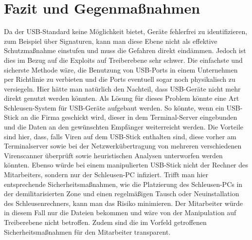 \chapter{Fazit und Gegenmaßnahmen}
Da der USB-Standard keine Möglichkeit bietet, Geräte fehlerfrei zu identifizieren, zum Beispiel über Signaturen, kann man diese Ebene nicht als effektive Schutzmaßnahme einstufen und muss die Gefahren direkt eindämmen. Jedoch ist dies im Bezug auf die Exploits auf Treiberebene sehr schwer. Die einfachste und sicherste Methode wäre, die Benutzung von USB-Ports in einem Unternehmen per Richtlinie zu verbieten und die Ports eventuell sogar noch physikalisch zu versiegeln. Hier hätte man natürlich den Nachteil, dass USB-Geräte nicht mehr direkt genutzt werden könnten. Als Lösung für dieses Problem könnte eine Art Schleusen-System für USB-Geräte aufgebaut werden. So könnte, wenn ein USB-Stick an die Firma geschickt wird, dieser in dem Terminal-Server eingebunden und die Daten an den gewünschten Empfänger weiterreicht werden. Die Vorteile sind hier, dass, falls Viren auf dem USB-Stick enthalten sind, diese vorher am Terminalserver sowie bei der Netzwerkübertragung von mehreren verschiedenen Virenscanner überprüft sowie heuristischen Analysen unterworfen werden könnten. Ebenso würde bei einem manipulierten USB-Stick nicht der Rechner des Mitarbeiters, sondern nur der Schleusen-PC infiziert. Trifft man hier entsprechende Sicherheitsmaßnahmen, wie die Platzierung des Schleusen-PCs in der demilitarisierten Zone und einen regelmäßigen Tausch oder Neuinstallation des Schleusenrechners, kann man das Risiko minimieren. Der Mitarbeiter würde in diesem Fall nur die Dateien bekommen und wäre von der Manipulation auf Treiberebene nicht betroffen. Zudem sind die im Vorfeld getroffenen Sicherheitsmaßnahmen für den Mitarbeiter transparent.